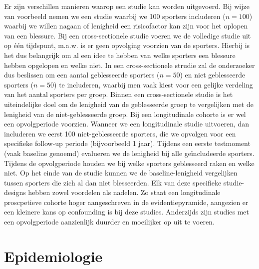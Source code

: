 \documentclass[
]{book}
\theoremstyle{definition}
\theoremstyle{definition}
\theoremstyle{definition}
\theoremstyle{definition}
\theoremstyle{remark}
\begin{document}
Er zijn verschillen manieren waarop een studie kan worden uitgevoerd. Bij wijze van voorbeeld nemen we een studie waarbij we 100 sporters includeren (\(n = 100\)) waarbij we willen nagaan of lenigheid een risicofactor kan zijn voor het oplopen van een blessure. Bij een cross-sectionele studie voeren we de volledige studie uit op één tijdspunt, m.a.w. is er geen opvolging voorzien van de sporters. Hierbij is het dus belangrijk om al een idee te hebben van welke sporters een blessure hebben opgelopen en welke niet. In een cross-sectionele strudie zal de onderzoeker dus beslissen om een aantal geblesseerde sporters (\(n = 50\)) en niet geblesseerde sporters (\(n = 50\)) te includeren, waarbij men vaak kiest voor een gelijke verdeling van het aantal sporters per groep. Binnen een cross-sectionele studie is het uiteindelijke doel om de lenigheid van de geblesseerde groep te vergelijken met de lenigheid van de niet-geblesseerde groep. Bij een longitudinale cohorte is er wel een opvolgperiode voorzien. Wanneer we een longitudinale studie uitvoeren, dan includeren we eerst 100 niet-geblesseerde sporters, die we opvolgen voor een specifieke follow-up periode (bijvoorbeeld 1 jaar). Tijdens een eerste testmoment (vaak baseline genoemd) evalueren we de lenigheid bij alle geïncludeerde sporters. Tijdens de opvolgperiode houden we bij welke sporters geblesseerd raken en welke niet. Op het einde van de studie kunnen we de baseline-lenigheid vergelijken tussen sporters die zich al dan niet blesseerden. Elk van deze specifieke studie-designs hebben zowel voordelen als nadelen. Zo staat een longitudinale proscpetieve cohorte hoger aangeschreven in de evidentiepyramide, aangezien er een kleinere kans op confounding is bij deze studies. Anderzijds zijn studies met een opvolgperiode aanzienlijk duurder en moeilijker op uit te voeren.

\hypertarget{epidemiologie}{%
\section*{Epidemiologie}\label{epidemiologie}}
\end{document}
